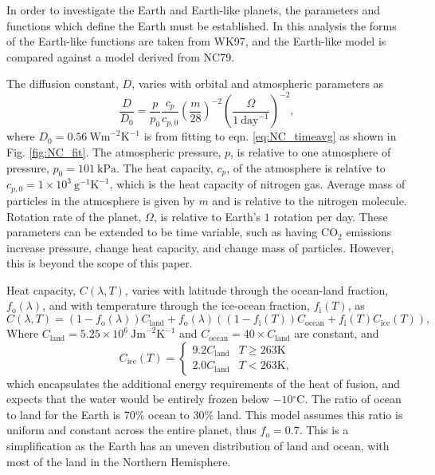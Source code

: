 \documentclass[12pt, onecolumn]{revtex4-2}    %
\newcommand{\heatcap}{\ensuremath{\ \text{Jm}^{-2} \text{K}^{-1}}}
\newcommand{\diffusion}{\ensuremath{\ \text{Wm}^{-2} \text{K}^{-1}}}
\newcommand{\degrees}{\ensuremath{^{\circ}}}
\begin{document}
In order to investigate the Earth and Earth-like planets, the parameters and functions which define the Earth must be established.
In this analysis the forms of the Earth-like functions are taken from WK97, and the Earth-like model is compared against a model derived from NC79.


The diffusion constant, $D$, varies with orbital and atmospheric parameters as
\begin{equation}
  \frac{D}{D_0} = \frac{p}{p_0} \frac{c_p}{c_{p,0}} \left(\frac{m}{28}\right)^{-2} \left(\frac{\Omega}{1\ \text{day}^{-1}}\right)^{-2},
  \label{eq:diffusion_eqn}
\end{equation}
where $D_0 = 0.56 \diffusion$ is from fitting to eqn. \eqref{eq:NC_timeavg} as shown in Fig. \ref{fig:NC_fit}.
The atmospheric pressure, $p$, is relative to one atmosphere of pressure, $p_0 = 101 \ \text{kPa}$.
The heat capacity, $c_p$, of the atmosphere is relative to $c_{p,0} = 1\times10^3 \ \text{g}^{-1} \text{K}^{-1}$, which is the heat capacity of nitrogen gas.
Average mass of particles in the atmosphere is given by $m$ and is relative to the nitrogen molecule.
Rotation rate of the planet, $\Omega$, is relative to Earth's $1$ rotation per day.
These parameters can be extended to be time variable, such as having CO$_2$ emissions increase pressure, change heat capacity, and change mass of particles.
However, this is beyond the scope of this paper.

Heat capacity, $C(\lambda, T)$, varies with latitude through the ocean-land fraction, $f_\text{o}(\lambda)$, and with temperature through the ice-ocean fraction, $f_\text{i}(T)$, as
\begin{equation}
  C(\lambda, T) = (1 - f_\text{o}(\lambda)) C_\text{land} + f_\text{o}(\lambda) ((1-f_\text{i}(T)) C_\text{ocean} + f_\text{i}(T) C_\text{ice}(T)),
  \label{eq:heat_capacity}
\end{equation}
Where $C_{\text{land}} = 5.25\times10^6 \heatcap$ and $C_{\text{ocean}} = 40 \times C_{\text{land}}$ are constant, and
\begin{equation}
  C_{\text{ice}}(T) =
  \begin{cases}
    9.2 C_\text{land} & T \ge 263\text{K} \\
    2.0 C_\text{land} & T < 263\text{K},
  \end{cases}
  \label{eq:heat_capacity_ice}
\end{equation}
which encapsulates the additional energy requirements of the heat of fusion, and expects that the water would be entirely frozen below $-10\degrees$C.
The ratio of ocean to land for the Earth is 70\% ocean to 30\% land.
This model assumes this ratio is uniform and constant across the entire planet, thus $f_\text{o} = 0.7$.
This is a simplification as the Earth has an uneven distribution of land and ocean, with most of the land in the Northern Hemisphere.
\end{document}
